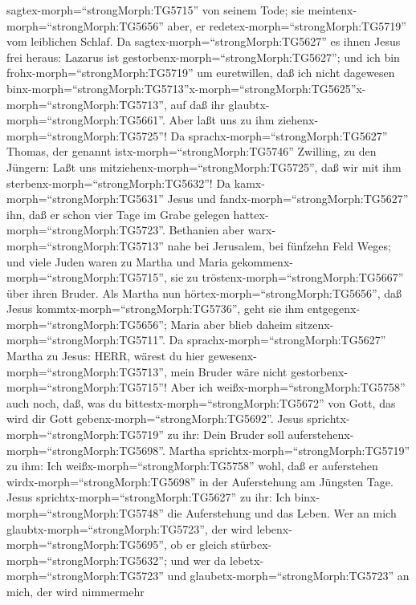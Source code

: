 sagtex-morph=``strongMorph:TG5715'' von seinem Tode; sie
meintenx-morph=``strongMorph:TG5656'' aber, er
redetex-morph=``strongMorph:TG5719'' vom leiblichen Schlaf.
 Da sagtex-morph=``strongMorph:TG5627'' es ihnen Jesus frei
heraus: Lazarus ist gestorbenx-morph=``strongMorph:TG5627'';
 und ich bin frohx-morph=``strongMorph:TG5719'' um
euretwillen, daß ich nicht dagewesen
binx-morph=``strongMorph:TG5713''\textbar x-morph=``strongMorph:TG5625''x-morph=``strongMorph:TG5713'',
auf daß ihr glaubtx-morph=``strongMorph:TG5661''. Aber laßt uns zu ihm
ziehenx-morph=``strongMorph:TG5725''!  Da
sprachx-morph=``strongMorph:TG5627'' Thomas, der genannt
istx-morph=``strongMorph:TG5746'' Zwilling, zu den Jüngern: Laßt uns
mitziehenx-morph=``strongMorph:TG5725'', daß wir mit ihm
sterbenx-morph=``strongMorph:TG5632''!  Da
kamx-morph=``strongMorph:TG5631'' Jesus und
fandx-morph=``strongMorph:TG5627'' ihn, daß er schon vier Tage im Grabe
gelegen hattex-morph=``strongMorph:TG5723''.  Bethanien
aber warx-morph=``strongMorph:TG5713'' nahe bei Jerusalem, bei fünfzehn
Feld Weges;  und viele Juden waren zu Martha und Maria
gekommenx-morph=``strongMorph:TG5715'', sie zu
tröstenx-morph=``strongMorph:TG5667'' über ihren Bruder. 
Als Martha nun hörtex-morph=``strongMorph:TG5656'', daß Jesus
kommtx-morph=``strongMorph:TG5736'', geht sie ihm
entgegenx-morph=``strongMorph:TG5656''; Maria aber blieb daheim
sitzenx-morph=``strongMorph:TG5711''.  Da
sprachx-morph=``strongMorph:TG5627'' Martha zu Jesus: HERR, wärest du
hier gewesenx-morph=``strongMorph:TG5713'', mein Bruder wäre nicht
gestorbenx-morph=``strongMorph:TG5715''!  Aber ich
weißx-morph=``strongMorph:TG5758'' auch noch, daß, was du
bittestx-morph=``strongMorph:TG5672'' von Gott, das wird dir Gott
gebenx-morph=``strongMorph:TG5692''.  Jesus
sprichtx-morph=``strongMorph:TG5719'' zu ihr: Dein Bruder soll
auferstehenx-morph=``strongMorph:TG5698''.  Martha
sprichtx-morph=``strongMorph:TG5719'' zu ihm: Ich
weißx-morph=``strongMorph:TG5758'' wohl, daß er auferstehen
wirdx-morph=``strongMorph:TG5698'' in der Auferstehung am Jüngsten Tage.
 Jesus sprichtx-morph=``strongMorph:TG5627'' zu ihr: Ich
binx-morph=``strongMorph:TG5748'' die Auferstehung und das Leben. Wer an
mich glaubtx-morph=``strongMorph:TG5723'', der wird
lebenx-morph=``strongMorph:TG5695'', ob er gleich
stürbex-morph=``strongMorph:TG5632'';  und wer da
lebetx-morph=``strongMorph:TG5723'' und
glaubetx-morph=``strongMorph:TG5723'' an mich, der wird nimmermehr
